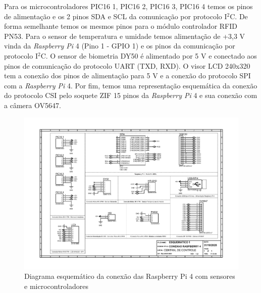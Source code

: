 \begin{apendicesenv}
Para os microcontroladores PIC16 1, PIC16 2, PIC16 3, PIC16 4 temos os pinos de alimentação e os 2 pinos SDA e SCL da comunicação por protocolo I$^2$C. De forma semelhante temos os mesmos pinos para o módulo controlador RFID PN53. Para o sensor de temperatura e umidade temos alimentação de +3,3 V vinda da \textit{Raspberry Pi} 4  (Pino 1 - GPIO 1) e os pinos da comunicação por protocolo I$^2$C. O sensor de biometria DY50 é alimentado por 5 V e conectado aos pinos de comunicação do protocolo UART (TXD, RXD). O visor LCD 240x320 tem a conexão dos pinos de alimentação para 5 V e a conexão do protocolo SPI com a \textit{Raspberry Pi} 4. Por fim, temos uma representação esquemática da conexão do protocolo CSI pelo soquete ZIF 15 pinos da \textit{Raspberry Pi} 4 e sua conexão com a câmera OV5647.

\begin{landscape}
\begin{figure}[H]
    \centering
    \vspace{-2cm}
    \includegraphics[width=1.25\textwidth, height=2\textheight,keepaspectratio]{figuras/eletronica/esquematicos/esquematico_1_rpi4.pdf}
    \caption{Diagrama esquemático da conexão das Raspberry Pi 4 com sensores e microcontroladores}
    \label{fig:esquematico_1}
\end{figure}
\end{landscape}



\end{apendicesenv}
